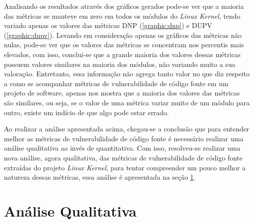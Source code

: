 Analisando os resultados através dos gráficos gerados pode-se ver que a maioria das métricas se manteve
em zero em todos os módulos do \emph{Linux Kernel}, tendo variado apenas os
valores das métricas DNP (\ref{graphic:dnp}) e DUPV (\ref{graphic:dupv}). Levando 
em consideração apenas os gráficos das métricas não nulas, pode-se ver que os valores 
das métricas se concentram nos percentis mais elevados, com isso, conclui-se que
a grande maioria dos valores dessas métricas possuem valores similares na
maioria dos módulos, não variando muito a sua valoração. Entretanto, essa
informação não agrega tanto valor no que diz respeito a como se acompanhar
métricas de vulnerabilidade de código fonte em um projeto de software, apenas nos mostra que a
maioria dos valores das métricas são similares, ou seja, se o valor de uma
métrica variar muito de um módulo para outro, existe um indício de que algo pode
estar errado.

Ao realizar a análise apresentada acima, chegou-se a conclusão que para entender
melhor as métricas de vulnerabilidade de código fonte é necessário realizar uma
análise qualitativa ao invés de quantitativa. Com isso, resolveu-se realizar uma
nova análise, agora qualitativa, das métricas de vulnerabilidade de código fonte
extraídas do projeto \emph{Linux Kernel}, para tentar compreender um pouco
melhor a natureza dessas métricas, essa análise é apresentada na seção
\ref{sec:analise_qualitativa}.

\section{Análise Qualitativa} \label{sec:analise_qualitativa}

